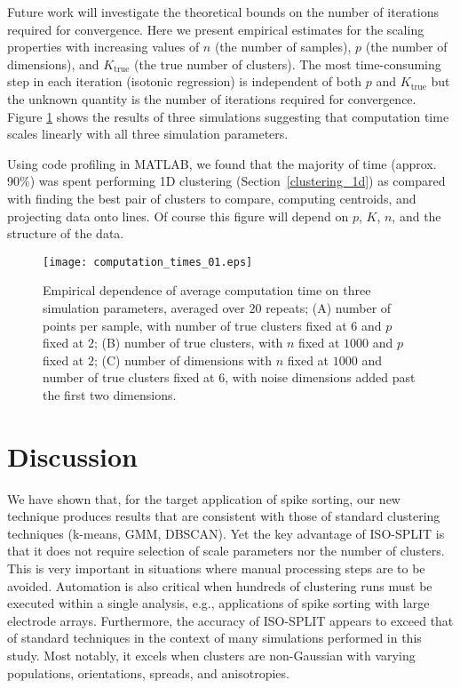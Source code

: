 \documentclass[10pt]{article}
\begin{document}
Future work will investigate the theoretical bounds on the number of iterations required for convergence. Here we present empirical estimates for the scaling properties with increasing values of $n$ (the number of samples), $p$ (the number of dimensions), and $K_\text{true}$ (the true number of clusters). The most time-consuming step in each iteration (isotonic regression) is independent of both $p$ and $K_\text{true}$ but the unknown quantity is the number of iterations required for convergence. Figure \ref{fig:computation_times_01} shows the results of three simulations suggesting that computation time scales linearly with all three simulation parameters.

Using code profiling in MATLAB, we found that the majority of time (approx. 90\%) was spent performing 1D clustering (Section~\ref{clustering_1d}) as compared with finding the best pair of clusters to compare, computing centroids, and projecting data onto lines. Of course this figure will depend on $p$, $K$, $n$, and the structure of the data.

\begin{figure}
\begin{center}
\texttt{[image: computation\_times\_01.eps]}
\end{center}
\caption{
Empirical dependence of average computation time on three simulation parameters, averaged over $20$ repeats; (A) number of points per sample, with number of true clusters fixed at $6$ and $p$ fixed at $2$; (B) number of true clusters, with $n$ fixed at $1000$ and $p$ fixed at $2$; (C) number of dimensions with $n$ fixed at $1000$ and number of true clusters fixed at $6$, with noise dimensions added past the first two dimensions.
}
\label{fig:computation_times_01}
\end{figure}

\section {Discussion}

We have shown that, for the target application of spike sorting, our new technique produces results that are consistent with those of standard clustering techniques (k-means, GMM, DBSCAN). Yet the key advantage of ISO-SPLIT is that it does not require selection of scale parameters nor the number of clusters. This is very important in situations where manual processing steps are to be avoided.
Automation is also critical when hundreds of clustering runs must be executed within a single analysis, e.g., applications of spike sorting with large electrode arrays. Furthermore, the accuracy of ISO-SPLIT appears to exceed that of standard techniques in the context of many simulations performed in this study. Most notably, it excels when clusters are non-Gaussian with varying populations, orientations, spreads, and anisotropies.
\end{document}
